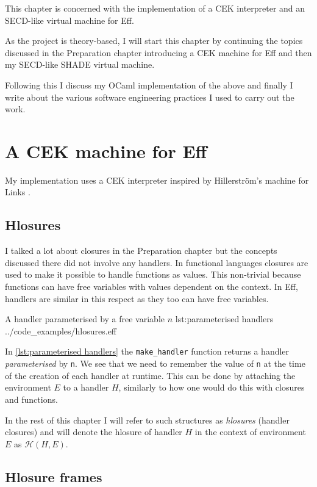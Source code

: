 \documentclass[class=article, crop=false]{standalone}
\begin{document}
This chapter is concerned with the implementation of a CEK interpreter and an
SECD-like virtual machine for Eff. 

As the project is theory-based, I will start
this chapter by continuing the topics discussed in the Preparation chapter
introducing a CEK machine for Eff and then my SECD-like SHADE virtual machine.

Following this I discuss my OCaml implementation of the above and finally I
write about the various software engineering practices I used to carry out the
work.


\section{A CEK machine for Eff}

My implementation uses a CEK interpreter inspired by Hillerström's
machine for Links \cite{hillerstrom2016compilation}.

\subsection{Hlosures}

I talked a lot about closures in the Preparation chapter but the concepts
discussed there did not involve any handlers. In functional languages closures
are used to make it possible to handle functions as values. This non-trivial
because functions can have free variables with values 
dependent on the context. In Eff, handlers are similar in this respect
as they too can have free variables.

{A handler parameterised by a free variable $n$}
{lst:parameterised handlers}
{../code_examples/hlosures.eff}

In \autoref{lst:parameterised handlers} the \lstinline|make_handler| function
returns a handler \emph{parameterised} by \lstinline|n|. We see that we need to
remember the value of \verb|n| at the time of the creation of each handler
at runtime. This can be done by attaching the environment $E$ to a handler $H$,
similarly to how one would do this with closures and functions.

In the rest of this chapter I will refer to such structures as \emph{hlosures}
(handler closures) and will denote the hlosure of handler $H$ in the context of
environment $E$ as $\mathcal{H}(H, E)$.

\subsection{Hlosure frames}
\end{document}
